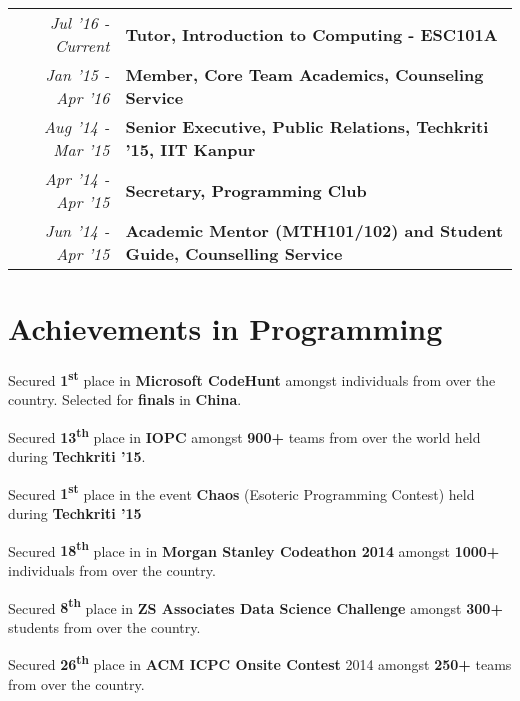 \documentclass[a4paper]{norm-resume}
\begin{document}
	\begin{tabular}{r|p{16cm}}	

	\null \hspace{10mm} \emph{Jul '16 - Current} & \textbf{Tutor, Introduction to Computing - ESC101A}\\
	
	\emph{Jan '15 - Apr '16} & \textbf{Member, Core Team Academics, Counseling Service}\\

	\emph{Aug '14 - Mar '15} & \textbf{Senior Executive, Public Relations, Techkriti '15, IIT Kanpur}\\

	\emph{Apr '14 - Apr '15} & \textbf{Secretary, Programming Club}\\

	\emph{Jun '14 - Apr '15} & \textbf{Academic Mentor (MTH101/102) and Student Guide, Counselling Service}\\ 

	\end{tabular}


\vspace{1mm}	%



\section{Achievements in Programming \hrulefill}

\vspace{3mm} %

\begin{tightitemize}
	\item Secured \textbf{1\textsuperscript{st}} place in \textbf{Microsoft CodeHunt} amongst individuals from over the country. Selected for \textbf{finals} in \textbf{China}.
	\item Secured \textbf{13\textsuperscript{th}} place in \textbf{IOPC} amongst \textbf{900+} teams from over the world held during \textbf{Techkriti '15}.
	\item Secured \textbf{1\textsuperscript{st}} place in the event \textbf{Chaos} (Esoteric Programming Contest) held during \textbf{Techkriti '15}
	\item Secured \textbf{18\textsuperscript{th}} place in in \textbf{Morgan Stanley Codeathon 2014} amongst \textbf{1000+} individuals from over the country.
	\item Secured \textbf{8\textsuperscript{th}} place in \textbf{ZS Associates Data Science Challenge} amongst \textbf{300+} students from over the country.
	\item Secured \textbf{26\textsuperscript{th}} place in \textbf{ACM ICPC Onsite Contest} 2014 amongst \textbf{250+} teams from over the country.
\end{tightitemize}
\end{document}
